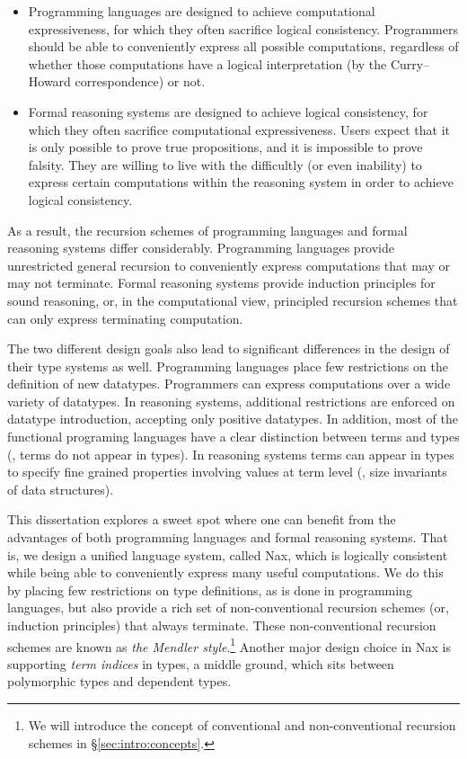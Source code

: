 \begin{itemize}

\item
Programming languages are designed to achieve computational expressiveness,
for which they often sacrifice logical consistency.
Programmers should be able to conveniently express all possible computations,
regardless of whether those computations have a logical interpretation
(by the Curry--Howard correspondence) or not.

\item
Formal reasoning systems are designed to achieve logical consistency, for which
they often sacrifice computational expressiveness.
Users expect that it is only possible to prove true propositions,
and it is impossible to prove falsity. They are willing to live with
the difficultly (or even inability) to express certain computations
within the reasoning system in order to achieve logical consistency.

\end{itemize}

As a result, the recursion schemes of programming languages and
formal reasoning systems differ considerably.
Programming languages provide unrestricted general recursion
to conveniently express computations that may or may not terminate.
Formal reasoning systems provide induction principles for sound reasoning,
or, in the computational view, principled recursion schemes that can only
express terminating computation.

The two different design goals also lead to significant differences
in the design of their type systems as well. Programming languages place
few restrictions on the definition of new datatypes. Programmers can
express computations over a wide variety of datatypes. 
In reasoning systems, additional restrictions are enforced on datatype
introduction, accepting only positive datatypes. 
In addition,
most of the functional programing languages have a clear distinction between
terms and types (\ie, terms do not appear in types).
In reasoning systems terms can appear in types to specify
fine grained properties involving values at term level
(\eg, size invariants of data structures).



This dissertation explores a sweet spot where one can benefit from
the advantages of both programming languages and formal reasoning systems.
That is, we design a unified language system, called Nax, which is
logically consistent while being able to conveniently express
many useful computations. We do this by placing few restrictions
on type definitions, as is done in programming languages, but also
provide a rich set of non-conventional recursion schemes
(or, induction principles) that always terminate.
These non-conventional recursion schemes are known as
\emph{the Mendler style}.\footnote{We will introduce
        the concept of conventional and non-conventional recursion schemes
        in \S\ref{sec:intro:concepts}.}
Another major design choice in Nax is supporting \emph{term indices} in types,
a middle ground, which sits between polymorphic types and dependent types.

